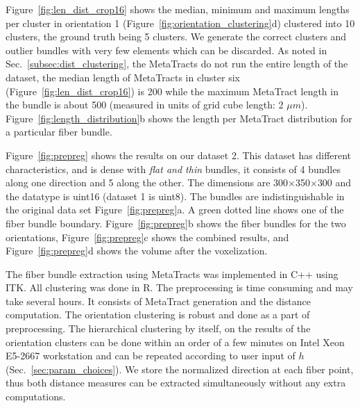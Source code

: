 Figure~\ref{fig:len_dist_crop16} shows the median, minimum and maximum lengths per cluster in orientation 1 (Figure~\ref{fig:orientation_clustering}d) clustered into 10 clusters, the ground truth being  5 clusters. We generate the correct clusters and outlier bundles with very few elements which can be discarded. As noted in Sec.~\ref{subsec:dist_clustering}, the MetaTracts do not run the entire length of the dataset, the median length of MetaTracts in cluster six (Figure~\ref{fig:len_dist_crop16}) is 200 while the maximum MetaTract length in the bundle is about 500 (measured in units of grid cube length: 2 $\mu m$). Figure~\ref{fig:length_distribution}b shows the length per MetaTract distribution for a particular fiber bundle. 

Figure~\ref{fig:prepreg} shows the results on our dataset 2. This dataset has different characteristics, and is dense with \textit{flat and thin} bundles, it consists of 4 bundles along one direction and 5 along the other. The dimensions are 300$\times$350$\times$300 and the datatype is uint16 (dataset 1 is uint8). The bundles are indistinguishable in the original data set Figure~\ref{fig:prepreg}a. A green dotted line shows one of the fiber bundle boundary. Figure~\ref{fig:prepreg}b shows the fiber bundles for the two orientations, Figure~\ref{fig:prepreg}c shows the combined results, and Figure~\ref{fig:prepreg}d shows the volume after the voxelization.

The fiber bundle extraction using MetaTracts was implemented in C++ using ITK. All clustering was done in R. The preprocessing is time consuming and may take several hours. It consists of MetaTract generation and the distance computation. The orientation clustering is robust and done as a part of preprocessing. The hierarchical clustering by itself, on the results of the orientation clusters can be done within an order of a few minutes on Intel Xeon E5-2667 workstation and can be repeated according to user input of $h$ (Sec.~\ref{sec:param_choices}). We store the normalized direction at each fiber point, thus both distance measures can be extracted simultaneously without any extra computations.




